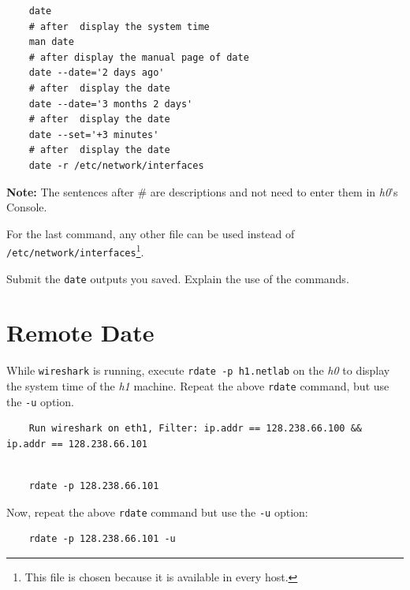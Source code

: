 \documentclass{UTNetLab}
\begin{document}
    
    \begin{lstlisting}
    date
    # after  display the system time 
    man date
	# after display the manual page of date
	date --date='2 days ago'
	# after  display the date
	date --date='3 months 2 days'
	# after  display the date
	date --set='+3 minutes'
	# after  display the date
	date -r /etc/network/interfaces
    \end{lstlisting}
\textbf{Note:} The sentences after \# are descriptions and  not need to enter them in \textit{h0}'s Console.
 
    For the last command, any other file can be used instead of \lstinline{/etc/network/interfaces}\footnote{This file is chosen because it is available in every host.}. 
    
    \begin{report}
    \item Submit the \lstinline{date} outputs you saved.
    Explain the use of the commands.
    \end{report}

\section{Remote Date}
   While \lstinline{wireshark} is running, execute \lstinline[emph={h1,netlab}]{rdate -p h1.netlab} on the \textit{h0} to display the system time of the \textit{h1} machine.
   Repeat the above \lstinline{rdate} command, but use the \lstinline{-u} option.
          
    \begin{lstlisting}
    Run wireshark on eth1, Filter: ip.addr == 128.238.66.100 && ip.addr == 128.238.66.101
       
    \end{lstlisting}
    
    \begin{lstlisting}
    rdate -p 128.238.66.101
    \end{lstlisting}
    
    Now, repeat the above \lstinline{rdate} command but use the \lstinline{-u} option:
    
    \begin{lstlisting}
    rdate -p 128.238.66.101 -u
    \end{lstlisting}
    
\end{document}
